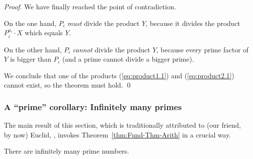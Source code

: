 \begin{proof}
We have finally reached the point of contradiction.

On the one hand, $P_i$ {\em must} divide the product $Y$, because it
divides the product $P_i^{a_i} \cdot X$ which equals $Y$.

On the other hand, $P_i$ {\em cannot} divide the product $Y$, because
every prime factor of $Y$ is bigger than $P_i$ (and a prime cannot
divide a bigger prime).

We conclude that one of the products (\ref{eq:product1.1}) and
(\ref{eq:product2.1}) cannot exist, so the theorem must hold.  \qed
\end{proof}


\subsubsection{A ``prime'' corollary: Infinitely many primes}
\label{sec:infinite-primes}

The main result of this section, which is traditionally attributed to
(our friend, by now) Euclid, , invokes
Theorem~\ref{thm:Fund-Thm-Arith} in a crucial way.

\begin{prop}
\label{thm:infinite-primes}
There are infinitely many prime numbers.
\end{prop}

